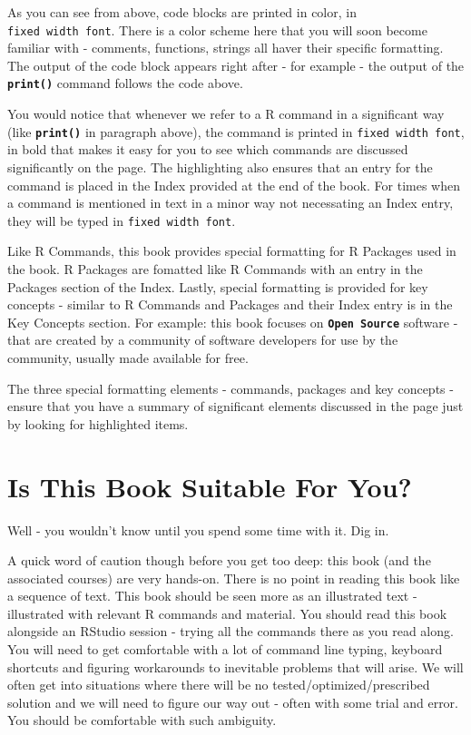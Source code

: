 \documentclass[]{krantz}
\begin{document}
As you can see from above, code blocks are printed in color, in
\texttt{fixed\ width\ font}. There is a color scheme here that you will
soon become familiar with - comments, functions, strings all haver their
specific formatting. The output of the code block appears right after -
for example - the output of the \textbf{\texttt{print()}} command
follows the code above.

You would notice that whenever we refer to a R command in a significant
way (like \textbf{\texttt{print()}} in paragraph above), the command is
printed in \texttt{fixed\ width\ font}, in bold that makes it easy for
you to see which commands are discussed significantly on the page. The
highlighting also ensures that an entry for the command is placed in the
Index provided at the end of the book. For times when a command is
mentioned in text in a minor way not necessating an Index entry, they
will be typed in \texttt{fixed\ width\ font}.

Like R Commands, this book provides special formatting for R Packages
used in the book. R Packages are fomatted like R Commands with an entry
in the Packages section of the Index. Lastly, special formatting is
provided for key concepts - similar to R Commands and Packages and their
Index entry is in the Key Concepts section. For example: this book
focuses on \textbf{\texttt{Open\ Source}} software - that are created by
a community of software developers for use by the community, usually
made available for free.

The three special formatting elements - commands, packages and key
concepts - ensure that you have a summary of significant elements
discussed in the page just by looking for highlighted items.

\section*{Is This Book Suitable For
You?}\label{is-this-book-suitable-for-you}


Well - you wouldn't know until you spend some time with it. Dig in.

A quick word of caution though before you get too deep: this book (and
the associated courses) are very hands-on. There is no point in reading
this book like a sequence of text. This book should be seen more as an
illustrated text - illustrated with relevant R commands and material.
You should read this book alongside an RStudio session - trying all the
commands there as you read along. You will need to get comfortable with
a lot of command line typing, keyboard shortcuts and figuring
workarounds to inevitable problems that will arise. We will often get
into situations where there will be no tested/optimized/prescribed
solution and we will need to figure our way out - often with some trial
and error. You should be comfortable with such ambiguity.
\end{document}
